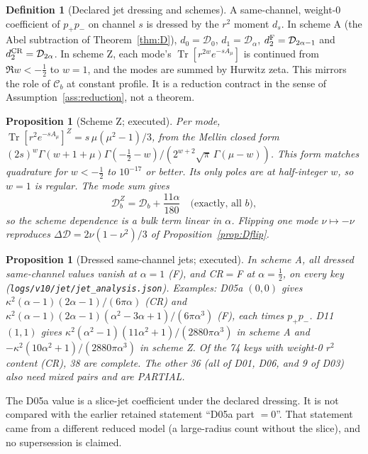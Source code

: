 \documentclass[11pt,a4paper]{article}
\newcommand{\Tr}{\operatorname{Tr}}
\newcommand{\loc}[1]{\nolinkurl{#1}}
\newcommand{\PARTIAL}{\textsf{PARTIAL}}
\newcommand{\Ccal}{\mathcal C}
\newcommand{\Dcal}{\mathcal D}
\theoremstyle{plain}
\newtheorem{proposition}[theorem]{Proposition}
\theoremstyle{definition}
\newtheorem{definition}[theorem]{Definition}
\theoremstyle{remark}
\numberwithin{equation}{section}
\begin{document}
\begin{definition}[Declared jet dressing and schemes]
A same-channel, weight-0 coefficient of \(p_+p_-\) on channel \(s\)
is dressed by the \(r^2\) moment \(d_s\). In scheme A (the Abel
subtraction of Theorem~\ref{thm:D}),
\(d_0=\Dcal_0\), \(d_1=\Dcal_\alpha\),
\(d_2^{\rm F}=\Dcal_{2\alpha-1}\) and
\(d_2^{\rm CR}=\Dcal_{2\alpha}\). In scheme Z, each mode's
\(\Tr[r^{2w}e^{-sA_\mu}]\) is continued from \(\Re w<-\tfrac12\) to
\(w=1\), and the modes are summed by Hurwitz zeta. This mirrors the
role of \(\Ccal_b\) at constant profile. It is a reduction contract
in the sense of Assumption~\ref{ass:reduction}, not a theorem.
\end{definition}

\begin{proposition}[Scheme Z; executed]
\label{prop:v10Z}
Per mode, \(\Tr[r^2e^{-sA_\mu}]^Z=s\,\mu(\mu^2-1)/3\), from the
Mellin closed form
\((2s)^w\Gamma(w+1+\mu)\Gamma(-\tfrac12-w)/(2^{w+2}\sqrt\pi\,\Gamma(\mu-w))\).
This form matches quadrature for \(w<-\tfrac12\) to \(10^{-17}\) or
better. Its only poles are at half-integer \(w\), so \(w=1\) is
regular. The mode sum gives
\[
 \Dcal^Z_b=\Dcal_b+\frac{11\alpha}{180}\quad\text{(exactly, all }b),
\]
so the scheme dependence is a bulk term linear in \(\alpha\). Flipping one mode
\(\nu\mapsto-\nu\) reproduces \(\Delta\Dcal=2\nu(1-\nu^2)/3\) of
Proposition~\ref{prop:Dflip}.
\end{proposition}

\begin{proposition}[Dressed same-channel jets; executed]
\label{prop:v10dressed}
In scheme A, all dressed same-channel values vanish at \(\alpha=1\)
(F), and CR\(=\)F at \(\alpha=\tfrac12\), on every key
(\loc{logs/v10/jet/jet_analysis.json}). Examples:
D05a \((0,0)\) gives
\(\kappa^2(\alpha-1)(2\alpha-1)/(6\pi\alpha)\) (CR) and
\(\kappa^2(\alpha-1)(2\alpha-1)(\alpha^2-3\alpha+1)/(6\pi\alpha^3)\) (F),
each times \(p_+p_-\). D11 \((1,1)\) gives
\(\kappa^2(\alpha^2-1)(11\alpha^2+1)/(2880\pi\alpha^3)\) in scheme A
and \(-\kappa^2(10\alpha^2+1)/(2880\pi\alpha^3)\) in scheme Z. Of the
74 keys with weight-0 \(r^2\) content (CR), 38 are complete. The
other 36 (all of D01, D06, and 9 of D03) also need mixed pairs and
are \PARTIAL.
\end{proposition}
The D05a value is a slice-jet coefficient under the declared
dressing. It is not compared with the earlier retained statement
``D05a part \(=0\)''. That statement came from a different reduced
model (a large-radius count without the slice), and no
supersession is claimed.
\end{document}
